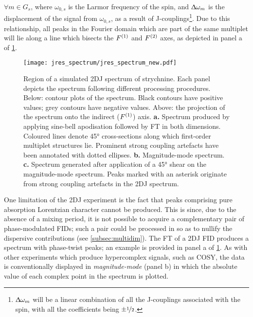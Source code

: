 $\forall m \in G_s$, where $\omega_{0,s}$ is the Larmor frequency of
the spin, and $\Updelta \omega_m$ is the displacement
of the signal from $\omega_{0,s}$, as a result of J-couplings\footnote{
    $\Updelta \omega_m$ will be a linear combination of all the J-couplings
    associated with the spin, with all the coefficients being $\pm
    \nicefrac{1}{2}$.
}. Due to this relationship, all peaks in the Fourier domain which are part of
the same multiplet will lie along a line which bisects the $F^{(1)}$ and $F^{(2)}$
axes, as depicted in panel a of \cref{fig:jres-spectrum}.
\begin{figure}%
    \centering%
    \texttt{[image: jres\_spectrum/jres\_spectrum\_new.pdf]}%
    \caption[
        Region of a \acs{2DJ} spectrum of strychnine.
    ]
    {%
        Region of a simulated \acs{2DJ} spectrum of strychnine.
        Each panel depicts the spectrum following different processing
        procedures. Below: contour plots of the spectrum.
        Black contours have positive values; grey contours have negative
        values.
        Above: the projection of the spectrum onto the indirect ($F^{(1)}$) axis.
        \textbf{a.} Spectrum produced by applying sine-bell apodisation
        followed by \ac{FT} in both dimensions.
        Coloured lines denote \ang{45} cross-sections along which first-order
        multiplet structures lie.
        Prominent strong coupling artefacts have been annotated with dotted
        ellipses.
        \textbf{b.} Magnitude-mode spectrum.
        \textbf{c.} Spectrum generated after application of a \ang{45} shear on
        the magnitude-mode spectrum. Peaks marked with an asterisk originate
        from strong coupling artefacts in the \ac{2DJ} spectrum.
   }%
    \label{fig:jres-spectrum}%
\end{figure}%

One limitation of the \ac{2DJ} experiment is the fact that peaks comprising
pure absorption Lorentzian character cannot be produced. This is since, due
to the absence of a mixing period, it is not possible to acquire a
complementary pair of phase-modulated \acp{FID}; such a pair could be processed
in so as to nullify the dispersive contributions (see \cref{subsec:multidim}).
The FT of a \ac{2DJ} \ac{FID} produces a spectrum with phase-twist
peaks; an example is provided in panel a of \cref{fig:jres-spectrum}. As with
other experiments which produce hypercomplex signals, such as \ac{COSY}, the
data is conventionally displayed in \emph{magnitude-mode}
(panel b) in which the absolute value of each complex point in the spectrum is
plotted.

